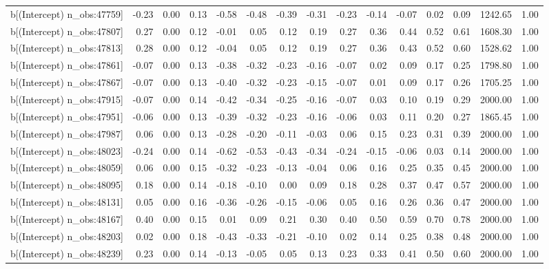 \begin{table}[ht]
\begin{tabular}{rrrrrrrrrrrrrrr}
  b[(Intercept) n\_obs:47759] & -0.23 & 0.00 & 0.13 & -0.58 & -0.48 & -0.39 & -0.31 & -0.23 & -0.14 & -0.07 & 0.02 & 0.09 & 1242.65 & 1.00 \\ 
  b[(Intercept) n\_obs:47807] & 0.27 & 0.00 & 0.12 & -0.01 & 0.05 & 0.12 & 0.19 & 0.27 & 0.36 & 0.44 & 0.52 & 0.61 & 1608.30 & 1.00 \\ 
  b[(Intercept) n\_obs:47813] & 0.28 & 0.00 & 0.12 & -0.04 & 0.05 & 0.12 & 0.19 & 0.27 & 0.36 & 0.43 & 0.52 & 0.60 & 1528.62 & 1.00 \\ 
  b[(Intercept) n\_obs:47861] & -0.07 & 0.00 & 0.13 & -0.38 & -0.32 & -0.23 & -0.16 & -0.07 & 0.02 & 0.09 & 0.17 & 0.25 & 1798.80 & 1.00 \\ 
  b[(Intercept) n\_obs:47867] & -0.07 & 0.00 & 0.13 & -0.40 & -0.32 & -0.23 & -0.15 & -0.07 & 0.01 & 0.09 & 0.17 & 0.26 & 1705.25 & 1.00 \\ 
  b[(Intercept) n\_obs:47915] & -0.07 & 0.00 & 0.14 & -0.42 & -0.34 & -0.25 & -0.16 & -0.07 & 0.03 & 0.10 & 0.19 & 0.29 & 2000.00 & 1.00 \\ 
  b[(Intercept) n\_obs:47951] & -0.06 & 0.00 & 0.13 & -0.39 & -0.32 & -0.23 & -0.16 & -0.06 & 0.03 & 0.11 & 0.20 & 0.27 & 1865.45 & 1.00 \\ 
  b[(Intercept) n\_obs:47987] & 0.06 & 0.00 & 0.13 & -0.28 & -0.20 & -0.11 & -0.03 & 0.06 & 0.15 & 0.23 & 0.31 & 0.39 & 2000.00 & 1.00 \\ 
  b[(Intercept) n\_obs:48023] & -0.24 & 0.00 & 0.14 & -0.62 & -0.53 & -0.43 & -0.34 & -0.24 & -0.15 & -0.06 & 0.03 & 0.14 & 2000.00 & 1.00 \\ 
  b[(Intercept) n\_obs:48059] & 0.06 & 0.00 & 0.15 & -0.32 & -0.23 & -0.13 & -0.04 & 0.06 & 0.16 & 0.25 & 0.35 & 0.45 & 2000.00 & 1.00 \\ 
  b[(Intercept) n\_obs:48095] & 0.18 & 0.00 & 0.14 & -0.18 & -0.10 & 0.00 & 0.09 & 0.18 & 0.28 & 0.37 & 0.47 & 0.57 & 2000.00 & 1.00 \\ 
  b[(Intercept) n\_obs:48131] & 0.05 & 0.00 & 0.16 & -0.36 & -0.26 & -0.15 & -0.06 & 0.05 & 0.16 & 0.26 & 0.36 & 0.47 & 2000.00 & 1.00 \\ 
  b[(Intercept) n\_obs:48167] & 0.40 & 0.00 & 0.15 & 0.01 & 0.09 & 0.21 & 0.30 & 0.40 & 0.50 & 0.59 & 0.70 & 0.78 & 2000.00 & 1.00 \\ 
  b[(Intercept) n\_obs:48203] & 0.02 & 0.00 & 0.18 & -0.43 & -0.33 & -0.21 & -0.10 & 0.02 & 0.14 & 0.25 & 0.38 & 0.48 & 2000.00 & 1.00 \\ 
  b[(Intercept) n\_obs:48239] & 0.23 & 0.00 & 0.14 & -0.13 & -0.05 & 0.05 & 0.13 & 0.23 & 0.33 & 0.41 & 0.50 & 0.60 & 2000.00 & 1.00 \\ 

\end{tabular}
\end{table}
